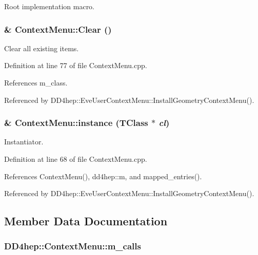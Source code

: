 Root implementation macro. \hypertarget{class_d_d4hep_1_1_context_menu_a6696f7477fe601dda441f5b8f409d97d}{
\subsubsection[{Clear}]{ \& ContextMenu::Clear ()}}
\label{class_d_d4hep_1_1_context_menu_a6696f7477fe601dda441f5b8f409d97d}


Clear all existing items. 

Definition at line 77 of file ContextMenu.cpp.

References m\_\-class.

Referenced by DD4hep::EveUserContextMenu::InstallGeometryContextMenu().\hypertarget{class_d_d4hep_1_1_context_menu_a2078c5a59a73ba9d83e6d22f1fa52e6a}{
\subsubsection[{instance}]{ \& ContextMenu::instance (TClass $\ast$ {\em cl})}}
\label{class_d_d4hep_1_1_context_menu_a2078c5a59a73ba9d83e6d22f1fa52e6a}


Instantiator. 

Definition at line 68 of file ContextMenu.cpp.

References ContextMenu(), dd4hep::m, and mapped\_\-entries().

Referenced by DD4hep::EveUserContextMenu::InstallGeometryContextMenu().

\subsection{Member Data Documentation}
\hypertarget{class_d_d4hep_1_1_context_menu_a4434fe38593c7eb73a8543cf1f8258ed}{
\subsubsection[{m\_\-calls}]{ {\bf DD4hep::ContextMenu::m\_\-calls}}}
\label{class_d_d4hep_1_1_context_menu_a4434fe38593c7eb73a8543cf1f8258ed}


